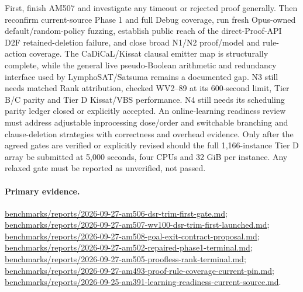 \documentclass[11pt]{article}
\begin{document}
First, finish AM507 and investigate any timeout or rejected proof generally.
Then reconfirm current-source Phase 1 and full Debug coverage, run fresh
Opus-owned default/random-policy fuzzing, establish public reach of the
direct-Proof-API D2F retained-deletion failure, and close broad N1/N2
proof/model and rule-action coverage. The CaDiCaL/Kissat clausal emitter map
is structurally complete, while the general live pseudo-Boolean arithmetic and
redundancy interface used by LymphoSAT/Satsuma remains a documented gap.
N3 still needs matched Rank attribution, checked WV2--89 at its 600-second
limit, Tier B/C parity and Tier D Kissat/VBS performance. N4 still needs its
scheduling parity ledger closed or explicitly accepted. An online-learning
readiness review must address adjustable inprocessing dose/order and
switchable branching and clause-deletion strategies with correctness and
overhead evidence. Only after the agreed gates are verified or explicitly
revised should the full 1,166-instance Tier D array be submitted at 5,000
seconds, four CPUs and 32 GiB per instance. Any relaxed gate must be reported
as unverified, not passed.

\paragraph{Primary evidence.}
\url{benchmarks/reports/2026-09-27-am506-dsr-trim-first-gate.md};
\url{benchmarks/reports/2026-09-27-am507-wv100-dsr-trim-first-launched.md};
\url{benchmarks/reports/2026-09-27-am508-goal-exit-contract-proposal.md};
\url{benchmarks/reports/2026-09-27-am502-repaired-phase1-terminal.md};
\url{benchmarks/reports/2026-09-27-am505-proofless-rank-terminal.md};
\url{benchmarks/reports/2026-09-27-am493-proof-rule-coverage-current-pin.md};
\url{benchmarks/reports/2026-09-25-am391-learning-readiness-current-source.md}.
\end{document}
